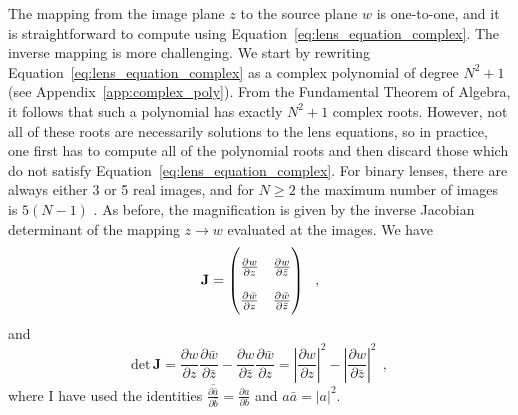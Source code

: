 \documentclass[12pt,dvipsnames]{report}
\newcommand{\hquad}{~~}
\begin{document}
The mapping from the image plane $z$ to the source plane $w$ is one-to-one, and
it is straightforward to compute using Equation~\ref{eq:lens_equation_complex}.
The inverse mapping is more challenging. We start by rewriting
Equation~\ref{eq:lens_equation_complex} as a complex polynomial of degree $N^2
    + 1$ (see Appendix~\ref{app:complex_poly}). From the Fundamental Theorem of
Algebra, it follows that such a polynomial has exactly $N^2+1$ complex roots.
However, not all of these roots are necessarily solutions to the lens equations,
so in practice, one first has to compute all of the polynomial roots and then
discard those which do not satisfy Equation~\ref{eq:lens_equation_complex}. 
For binary lenses, there are always either 3 or 5 real images, and for
$N\geq 2$ the maximum number of images is $5(N-1)$
\citep{arXiv:astro-ph/0103463,astro-ph/0305166,arXiv:math/0401188v2}. As
before, the magnification is given by the inverse Jacobian determinant of the
mapping $z\rightarrow w$ evaluated at the images. We have
\begin{equation}
    \mathbf{J}=
    \renewcommand\arraystretch{2}
    \begin{pmatrix}
        \frac{\partial w}{\partial z} & \frac{\partial w}{\partial \bar{z}} \\ \frac{\partial \bar{w}}{\partial z} & \frac{\partial \bar{w}}{\partial \bar{z}}
    \end{pmatrix}
    \hquad,
\end{equation}
and
\begin{equation}
    \mathrm{det}\,\mathbf{J}=\frac{\partial w}{\partial z}\frac{\partial \bar{w}}{\partial \bar{z}} - \frac{\partial w}{\partial \bar{z}}\frac{\partial \bar{w}}{\partial z} = \left|\frac{\partial w}{\partial z}\right|^2 - \left|\frac{\partial w}{\partial \bar{z}}\right|^2
    \hquad,
\end{equation}
where I have used the identities
$\overline{\frac{\partial\bar a}{\partial{\bar b}}}=\frac{\partial a}{\partial{b}}$ and $a\bar a=|a|^2$. 
\end{document}
